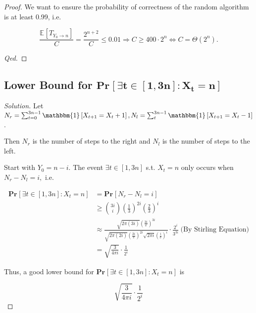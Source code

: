 \documentclass{article}
\renewcommand{\Pr}[2]{\mathbf{Pr}_{#1}\left[#2\right]}
\newcommand{\staExp}[2]{\mathbb{E}_{#1}\left[#2\right]}
\newenvironment{solution}{\begin{proof}[\noindent\it Solution]}{\end{proof}}
\begin{document}
\begin{proof}
    \hspace{1.3em}
    We want to ensure the probability of correctness of the random algorithm is at least 0.99, i.e.
    
    \vspace{-1em}
    $$\frac{\staExp{}{T_{Y_0\rightarrow n}}}{C}=\frac{2^{n+2}}{C}\le 0.01 \Longrightarrow C\geq 400\cdot 2^{n} \Longleftrightarrow C = \Theta(2^n).$$
    
    \hspace{39em}
    \textit{Qed.}
\end{proof}

\newpage
\subsection{Lower Bound for $\boldsymbol{\Pr{}{\exists t\in[1,3n]: X_t=n}}$}
\vspace{1em}
\begin{solution}
Let $N_r = \sum_{t=0}^{3n-1}\mathbbm{1}\left[X_{t+1}=X_t+1\right], N_l = \sum_{t}^{3n-1}\mathbbm{1}\left[X_{t+1}=X_t-1\right]$.

\hspace{2.5em}
Then $N_r$ is the number of steps to the right and $N_l$ is the number of steps to the left.

\hspace{2.6em}
Start with $Y_0=n-i$. The event $\exists t\in[1,3n]$ s.t. $X_t=n$ only occurs when $N_r - N_l = i,$ i.e.

\vspace{-3em}
\begin{align*}
    \Pr{}{\exists t\in[1,3n]: X_t=n} & = \Pr{}{N_r - N_l = i} \\
    &\geq \binom{3i}{i}\left(\frac{1}{3}\right)^{2i}\left(\frac{2}{3}\right)^{i} \\
    & \approx \frac{\sqrt{2\pi(3i)}\left(\frac{3i}{\mathrm{e}}\right)^{3i}}{\sqrt{2\pi(2i)}\left(\frac{2i}{\mathrm{e}}\right)^{2i}\sqrt{2\pi i}\left(\frac{i}{\mathrm{e}}\right)^{i}}\cdot\frac{2^i}{3^{3i}} \ \text{(By Stirling Equation)} \\
    & = \sqrt{\frac{3}{4\pi i}}\cdot\frac{1}{2^i}
\end{align*}

\hspace{2.6em}
Thus, a good lower bound for $\Pr{}{\exists t\in[1,3n]: X_t=n}$ is 

\vspace{-0.3em}
$$\sqrt{\frac{3}{4\pi i}}\cdot\frac{1}{2^i}$$

\vspace{-2.5em}
\end{solution}
\end{document}

